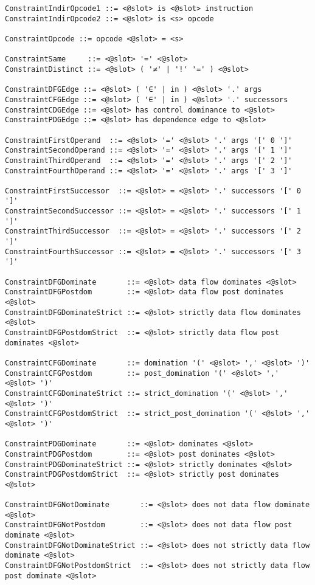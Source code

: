 \begin{lstlisting}[language=BNF,basicstyle=\small\ttfamily,
                   numbers=none,framexleftmargin=0pt,xleftmargin=0pt,]
ConstraintIndirOpcode1 ::= <@slot> is <@slot> instruction
ConstraintIndirOpcode2 ::= <@slot> is <s> opcode

ConstraintOpcode ::= opcode <@slot> = <s>

ConstraintSame     ::= <@slot> '=' <@slot>
ConstraintDistinct ::= <@slot> ( '≠' | '!' '=' ) <@slot>

ConstraintDFGEdge ::= <@slot> ( '∈' | in ) <@slot> '.' args
ConstraintCFGEdge ::= <@slot> ( '∈' | in ) <@slot> '.' successors
ConstraintCDGEdge ::= <@slot> has control dominance to <@slot>
ConstraintPDGEdge ::= <@slot> has dependence edge to <@slot>

ConstraintFirstOperand  ::= <@slot> '=' <@slot> '.' args '[' 0 ']'
ConstraintSecondOperand ::= <@slot> '=' <@slot> '.' args '[' 1 ']'
ConstraintThirdOperand  ::= <@slot> '=' <@slot> '.' args '[' 2 ']'
ConstraintFourthOperand ::= <@slot> '=' <@slot> '.' args '[' 3 ']'

ConstraintFirstSuccessor  ::= <@slot> = <@slot> '.' successors '[' 0 ']'
ConstraintSecondSuccessor ::= <@slot> = <@slot> '.' successors '[' 1 ']'
ConstraintThirdSuccessor  ::= <@slot> = <@slot> '.' successors '[' 2 ']'
ConstraintFourthSuccessor ::= <@slot> = <@slot> '.' successors '[' 3 ']'

ConstraintDFGDominate       ::= <@slot> data flow dominates <@slot>
ConstraintDFGPostdom        ::= <@slot> data flow post dominates <@slot>
ConstraintDFGDominateStrict ::= <@slot> strictly data flow dominates <@slot>
ConstraintDFGPostdomStrict  ::= <@slot> strictly data flow post dominates <@slot>

ConstraintCFGDominate       ::= domination '(' <@slot> ',' <@slot> ')'
ConstraintCFGPostdom        ::= post_domination '(' <@slot> ',' <@slot> ')'
ConstraintCFGDominateStrict ::= strict_domination '(' <@slot> ',' <@slot> ')'
ConstraintCFGPostdomStrict  ::= strict_post_domination '(' <@slot> ',' <@slot> ')'

ConstraintPDGDominate       ::= <@slot> dominates <@slot>
ConstraintPDGPostdom        ::= <@slot> post dominates <@slot>
ConstraintPDGDominateStrict ::= <@slot> strictly dominates <@slot>
ConstraintPDGPostdomStrict  ::= <@slot> strictly post dominates <@slot>

ConstraintDFGNotDominate       ::= <@slot> does not data flow dominate <@slot>
ConstraintDFGNotPostdom        ::= <@slot> does not data flow post dominate <@slot>
ConstraintDFGNotDominateStrict ::= <@slot> does not strictly data flow dominate <@slot>
ConstraintDFGNotPostdomStrict  ::= <@slot> does not strictly data flow post dominate <@slot>


\end{lstlisting}
